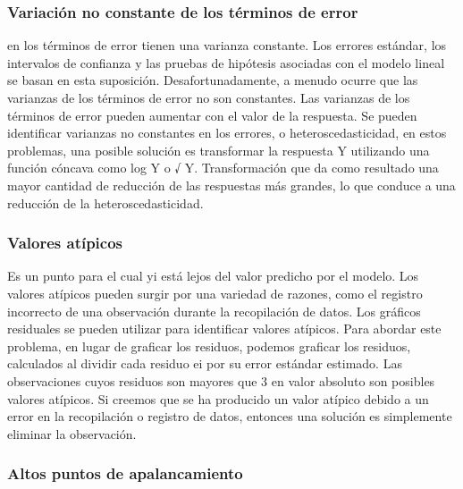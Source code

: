 \documentclass[
  letterpaper,
  DIV=11,
  numbers=noendperiod]{scrartcl}
\begin{document}
\hypertarget{variaciuxf3n-no-constante-de-los-tuxe9rminos-de-error}{%
\subsubsection{\texorpdfstring{\textbf{Variación no constante de los
términos de
error}}{Variación no constante de los términos de error}}\label{variaciuxf3n-no-constante-de-los-tuxe9rminos-de-error}}

en los términos de error tienen una varianza constante. Los errores
estándar, los intervalos de confianza y las pruebas de hipótesis
asociadas con el modelo lineal se basan en esta suposición.
Desafortunadamente, a menudo ocurre que las varianzas de los términos de
error no son constantes. Las varianzas de los términos de error pueden
aumentar con el valor de la respuesta. Se pueden identificar varianzas
no constantes en los errores, o heteroscedasticidad, en estos problemas,
una posible solución es transformar la respuesta Y utilizando una
función cóncava como log Y o √ Y. Transformación que da como resultado
una mayor cantidad de reducción de las respuestas más grandes, lo que
conduce a una reducción de la heteroscedasticidad.

\hypertarget{valores-atuxedpicos}{%
\subsubsection{\texorpdfstring{\textbf{Valores
atípicos}}{Valores atípicos}}\label{valores-atuxedpicos}}

Es un punto para el cual yi está lejos del valor predicho por el modelo.
Los valores atípicos pueden surgir por una variedad de razones, como el
registro incorrecto de una observación durante la recopilación de datos.
Los gráficos residuales se pueden utilizar para identificar valores
atípicos. Para abordar este problema, en lugar de graficar los residuos,
podemos graficar los residuos, calculados al dividir cada residuo ei por
su error estándar estimado. Las observaciones cuyos residuos son mayores
que 3 en valor absoluto son posibles valores atípicos. Si creemos que se
ha producido un valor atípico debido a un error en la recopilación o
registro de datos, entonces una solución es simplemente eliminar la
observación.

\hypertarget{altos-puntos-de-apalancamiento}{%
\subsubsection{\texorpdfstring{\textbf{Altos puntos de
apalancamiento}}{Altos puntos de apalancamiento}}\label{altos-puntos-de-apalancamiento}}
\end{document}
